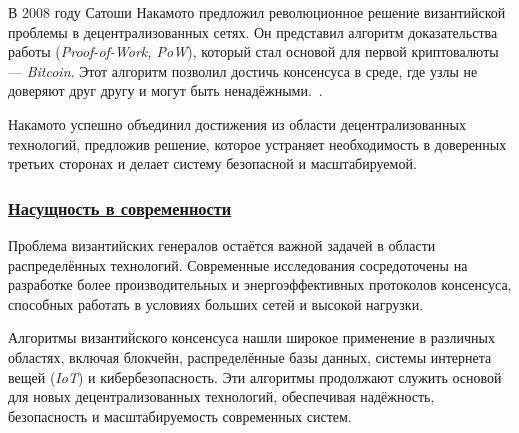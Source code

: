 \hspace{1.25cm} В 2008 году Сатоши Накамото предложил революционное решение византийской проблемы в децентрализованных сетях. Он представил алгоритм доказательства работы (\textit{Proof-of-Work, PoW}), который стал основой для первой криптовалюты — \textit{Bitcoin}. Этот алгоритм позволил достичь консенсуса в среде, где узлы не доверяют друг другу и могут быть ненадёжными.~\cite{plisio}.

Накамото успешно объединил достижения из области децентрализованных технологий, предложив решение, которое устраняет необходимость в доверенных третьих сторонах и делает систему безопасной и масштабируемой.

\subsubsection*{\underline{Насущность в современности}}

\hspace{1.25cm} Проблема византийских генералов остаётся важной задачей в области распределённых технологий. Современные исследования сосредоточены на разработке более производительных и энергоэффективных протоколов консенсуса, способных работать в условиях больших сетей и высокой нагрузки.

Алгоритмы византийского консенсуса нашли широкое применение в различных областях, включая блокчейн, распределённые базы данных, системы интернета вещей (\textit{IoT}) и кибербезопасность. Эти алгоритмы продолжают служить основой для новых децентрализованных технологий, обеспечивая надёжность, безопасность и масштабируемость современных систем.

\newpage